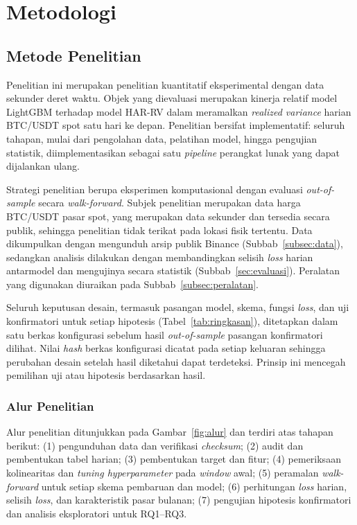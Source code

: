 \chapter{Metodologi}

\section{Metode Penelitian}
Penelitian ini merupakan penelitian kuantitatif eksperimental dengan data
sekunder deret waktu. Objek yang dievaluasi merupakan kinerja relatif model
LightGBM terhadap model HAR-RV dalam meramalkan \textit{realized variance}
harian BTC/USDT spot satu hari ke depan. Penelitian bersifat implementatif:
seluruh tahapan, mulai dari pengolahan data, pelatihan model, hingga pengujian
statistik, diimplementasikan sebagai satu \textit{pipeline} perangkat lunak
yang dapat dijalankan ulang.

Strategi penelitian berupa eksperimen komputasional dengan evaluasi
\textit{out-of-sample} secara \textit{walk-forward}. Subjek penelitian merupakan
data harga BTC/USDT pasar spot, yang merupakan data sekunder dan tersedia
secara publik, sehingga penelitian tidak terikat pada lokasi fisik tertentu.
Data dikumpulkan dengan mengunduh arsip publik Binance
(Subbab~\ref{subsec:data}), sedangkan analisis dilakukan dengan membandingkan
selisih \textit{loss} harian antarmodel dan mengujinya secara statistik
(Subbab~\ref{sec:evaluasi}). Peralatan yang digunakan diuraikan pada
Subbab~\ref{subsec:peralatan}.

Seluruh keputusan desain, termasuk pasangan model, skema, fungsi \textit{loss},
dan uji konfirmatori untuk setiap hipotesis (Tabel~\ref{tab:ringkasan}),
ditetapkan dalam satu berkas konfigurasi sebelum hasil \textit{out-of-sample}
pasangan konfirmatori dilihat. Nilai \textit{hash} berkas konfigurasi dicatat
pada setiap keluaran sehingga perubahan desain setelah hasil diketahui dapat
terdeteksi. Prinsip ini mencegah pemilihan uji atau hipotesis berdasarkan
hasil.

\subsection{Alur Penelitian}
Alur penelitian ditunjukkan pada Gambar~\ref{fig:alur} dan terdiri atas
tahapan berikut: (1) pengunduhan data dan verifikasi \textit{checksum};
(2) audit dan pembentukan tabel harian; (3) pembentukan target dan fitur;
(4) pemeriksaan kolinearitas dan \textit{tuning hyperparameter} pada
\textit{window} awal; (5) peramalan \textit{walk-forward} untuk setiap skema
pembaruan dan model; (6) perhitungan \textit{loss} harian, selisih
\textit{loss}, dan karakteristik pasar bulanan; (7) pengujian hipotesis
konfirmatori dan analisis eksploratori untuk RQ1--RQ3.

